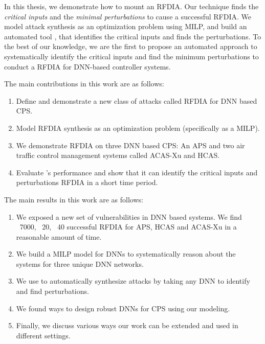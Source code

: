 In this thesis, we demonstrate how to mount an  \ac{RFDIA}.
Our technique finds the \textit{critical inputs} and the \textit{minimal perturbations} to cause a successful \ac{RFDIA}. 
We model attack synthesis as an optimization problem using \ac{MILP}, and build an automated tool \tool, that identifies the critical inputs and finds the perturbations.
To the best of our knowledge, we are the first to  propose an automated approach to systematically identify the critical inputs and find the minimum perturbations to conduct a \ac{RFDIA} for DNN-based controller systems.

The main contributions in this work are as follows:

\begin{enumerate}
	\item Define and demonstrate a new class of attacks called \ac{RFDIA} for \ac{DNN} based \ac{CPS}. 
	\item Model \ac{RFDIA} synthesis as an optimization problem (specifically as a \ac{MILP}). 
	\item We demonstrate \ac{RFDIA} on three \ac{DNN} based \ac{CPS}:  An \ac{APS} and two air traffic control management systems called \ac{ACAS-Xu} and \ac{HCAS}.
	\item Evaluate \tool's performance and show that it can identify the critical inputs and perturbations \ac{RFDIA} in a short time period.  
\end{enumerate}

The main results in this work are as follows:

\begin{enumerate}
	\item We exposed a new set of vulnerabilities in \ac{DNN} based systems. 
	 We find ~7000, ~20, ~40 successful \ac{RFDIA} for \ac{APS}, \ac{HCAS} and \ac{ACAS-Xu} in a reasonable amount of time. 
	\item We build a \ac{MILP} model for \ac{DNN}s to systematically reason about the systems for three unique \ac{DNN} networks. 
	\item We use \tool to automatically synthesize attacks by taking any \ac{DNN} to identify and find perturbations. 
	\item We found ways to design robust \ac{DNN}s for \ac{CPS} using our modeling. 
	\item Finally, we discuss various ways our work can be extended and used in different settings. 
\end{enumerate}


